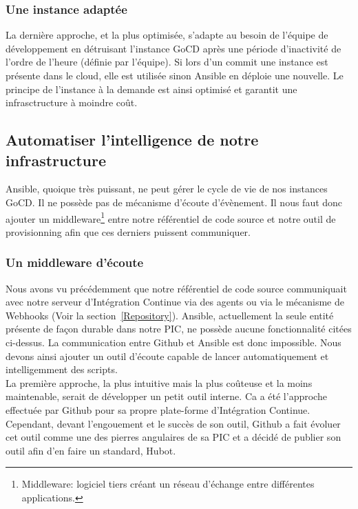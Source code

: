           \subsubsection{Une instance adaptée}
          La dernière approche, et la plus optimisée, s'adapte au besoin de l'équipe de développement en détruisant l'instance GoCD après une période d'inactivité de l'ordre de l'heure (définie par l'équipe). Si lors d'un commit une instance est présente dans le cloud, elle est utilisée sinon Ansible en déploie une nouvelle. Le principe de l'instance à la demande est ainsi optimisé et garantit une infrasctructure à moindre coût.

        \subsection{Automatiser l'intelligence de notre infrastructure}
        Ansible, quoique très puissant, ne peut gérer le cycle de vie de nos instances GoCD. Il ne possède pas de mécanisme d'écoute d'évènement. Il nous faut donc ajouter un middleware\footnote{Middleware: logiciel tiers créant un réseau d'échange entre différentes applications.} entre notre référentiel de code source et notre outil de provisionning afin que ces derniers puissent communiquer.\\


          \subsubsection{Un middleware d'écoute}
          Nous avons vu précédemment que notre référentiel de code source communiquait avec notre serveur d'Intégration Continue via des agents ou via le mécanisme de Webhooks (Voir la section~\ref{Repository}). Ansible, actuellement la seule entité présente de façon durable dans notre PIC, ne possède aucune fonctionnalité citées ci-dessus. La communication entre Github et Ansible est donc impossible. Nous devons ainsi ajouter un outil d'écoute capable de lancer automatiquement et intelligemment des scripts.\\

          La première approche, la plus intuitive mais la plus coûteuse et la moins maintenable, serait de développer un petit outil interne. Ca a été l'approche effectuée par Github pour sa propre plate-forme d'Intégration Continue. Cependant, devant l'engouement et le succès de son outil, Github a fait évoluer cet outil comme une des pierres angulaires de sa PIC et a décidé de publier son outil afin d'en faire un standard, Hubot.

